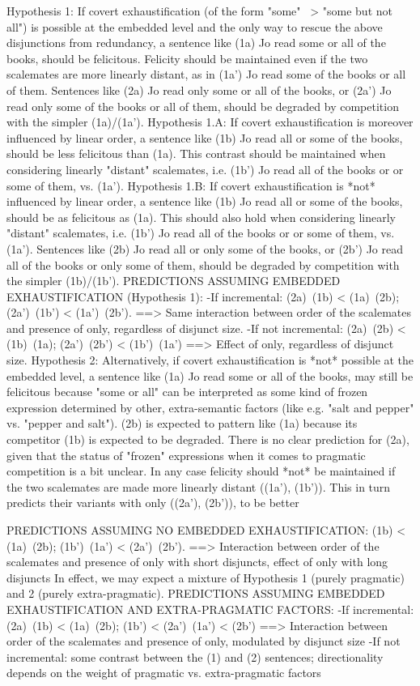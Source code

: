Hypothesis 1:
If covert exhaustification (of the form "some" ~> "some but not all") is possible at the embedded level
and the only way to rescue the above disjunctions from redundancy, a sentence like (1a) Jo read some or
all of the books, should be felicitous. Felicity should be maintained even if the two scalemates are more
linearly distant, as in (1a') Jo read some of the books or all of them. Sentences like (2a) Jo read only some
or all of the books, or (2a') Jo read only some of the books or all of them, should be degraded by
competition with the simpler (1a)/(1a').
Hypothesis 1.A:
If covert exhaustification is moreover influenced by linear order, a sentence like (1b) Jo read all or some
of the books, should be less felicitous than (1a). This contrast should be maintained when considering
linearly "distant" scalemates, i.e. (1b') Jo read all of the books or or some of them, vs. (1a').
Hypothesis 1.B:
If covert exhaustification is *not* influenced by linear order, a sentence like (1b) Jo read all or some of
the books, should be as felicitous as (1a). This should also hold when considering linearly "distant"
scalemates, i.e. (1b') Jo read all of the books or or some of them, vs. (1a'). Sentences like (2b) Jo read all
or only some of the books, or (2b') Jo read all of the books or only some of them, should be degraded by
competition with the simpler (1b)/(1b').
PREDICTIONS ASSUMING EMBEDDED EXHAUSTIFICATION (Hypothesis 1):
-If incremental: (2a)~(1b) < (1a)~(2b); (2a')~(1b') < (1a')~(2b').
==> Same interaction between order of the scalemates and presence of only, regardless of disjunct size.
-If not incremental: (2a)~(2b) < (1b)~(1a); (2a')~(2b') < (1b')~(1a')
==> Effect of only, regardless of disjunct size.
Hypothesis 2:
Alternatively, if covert exhaustification is *not* possible at the embedded level, a sentence like (1a) Jo
read some or all of the books, may still be felicitous because "some or all" can be interpreted as some
kind of frozen expression determined by other, extra-semantic factors (like e.g. "salt and pepper" vs.
"pepper and salt"). (2b) is expected to pattern like (1a) because its competitor (1b) is expected to be
degraded. There is no clear prediction for (2a), given that the status of "frozen" expressions when it
comes to pragmatic competition is a bit unclear. In any case felicity should *not* be maintained if the
two scalemates are made more linearly distant ((1a'), (1b')). This in turn predicts their variants with only
((2a'), (2b')), to be better


PREDICTIONS ASSUMING NO EMBEDDED EXHAUSTIFICATION:
(1b) < (1a)~(2b); (1b')~(1a') < (2a')~(2b').
==> Interaction between order of the scalemates and presence of only with short disjuncts, effect of only
with long disjuncts
In effect, we may expect a mixture of Hypothesis 1 (purely pragmatic) and 2 (purely extra-pragmatic).
PREDICTIONS ASSUMING EMBEDDED EXHAUSTIFICATION AND EXTRA-PRAGMATIC FACTORS:
-If incremental: (2a)~(1b) < (1a)~(2b); (1b') < (2a')~(1a') < (2b')
==> Interaction between order of the scalemates and presence of only, modulated by disjunct size
-If not incremental: some contrast between the (1) and (2) sentences; directionality depends on the
weight of pragmatic vs. extra-pragmatic factors


